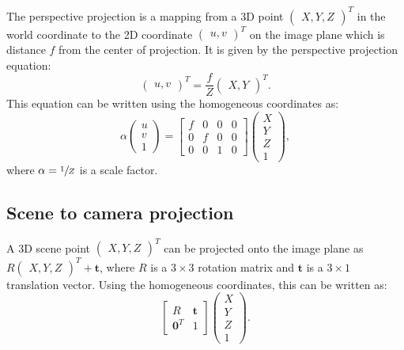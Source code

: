 The perspective projection is a mapping from a 3D point \(\begin{pmatrix}
	X, Y, Z
\end{pmatrix}^{T}\)
in the world coordinate
to the 2D coordinate \(\begin{pmatrix}
	u, v
\end{pmatrix}^{T}\)
on the image plane which is distance \(f\) from the center
of projection. It is given by the perspective projection equation:
\[
	\begin{pmatrix}
		u, v
	\end{pmatrix}^{T} = \frac{f}{Z} \begin{pmatrix}
		X, Y
	\end{pmatrix}^{T}.
\]
This equation can be written using the homogeneous coordinates as:
\begin{equation} \label{eq:perspective_projection}
	\alpha \begin{pmatrix}
		u \\ v \\ 1
	\end{pmatrix} = \begin{bmatrix}
		f & 0 & 0 & 0 \\
		0 & f & 0 & 0 \\
		0 & 0 & 1 & 0
	\end{bmatrix} \begin{pmatrix}
		X \\ Y \\ Z \\ 1
	\end{pmatrix},
\end{equation}
where \(\alpha = \sfrac{1}{Z}\) is a scale factor.

\subsection{Scene to camera projection}\label{sub:scene_to_camera_projection}

A 3D scene point \(\begin{pmatrix}
	X, Y, Z
\end{pmatrix}^{T}\) can be projected onto the image plane as
\(R \begin{pmatrix}
	X, Y, Z
\end{pmatrix}^{T} + \mathbf{t}\), where \(R\) is a \(3 \times 3\) rotation matrix
and \(\mathbf{t}\) is
a \(3 \times 1\) translation vector. Using the homogeneous coordinates, this
can be written as:
\begin{equation}
	\begin{bmatrix}
		R              & \mathbf{t} \\
		\mathbf{0}^{T} & 1
	\end{bmatrix} \begin{pmatrix}
		X \\ Y \\ Z \\ 1
	\end{pmatrix}.
\end{equation}

